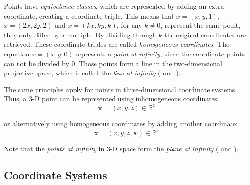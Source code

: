 Points have \textit{equivalence classes}, which are represented by adding an extra coordinate, creating a coordinate triple. This means that $x=(x,y,1)$, $x=(2x,2y,2)$ and $x=(kx,ky,k)$, for any $k\neq0$, represent the same point, they only differ by a multiple. By dividing through $k$ the original coordinates are retrieved. These coordinate triples are called \textit{homogeneous coordinates}. The equation $x=(x,y,0)$ represents a \textit{point at infinity}, since the coordinate points can not be divided by $0$. Those points form a line in the two-dimensional projective space, which is called the \textit{line at infinity} (\cite[p.30]{Szeliski.2011} and \cite[p.2]{Hartley.2011}).

The same principles apply for points in three-dimensional coordinate systems. Thus, a 3-D point  can be represented using inhomogeneous coordinates:
\begin{equation}
\mathbf{x} = (x,y,z)\in \mathbb{R}^3
\end{equation}  

or alternatively using homogeneous coordinates by adding another coordinate:
\begin{equation}
\mathbf{x} = (x,y,z,w)\in \mathbb{P}^3
\end{equation}  

Note that the \textit{points at infinity} in 3-D space form the \textit{plane at infinity} (\cite[p.31]{Szeliski.2011} and \cite[p.2]{Hartley.2011}).

\subsection{Coordinate Systems}
